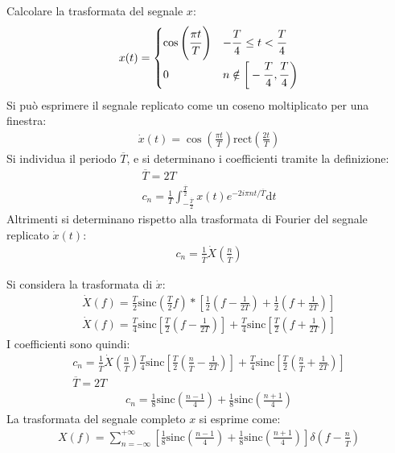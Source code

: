\documentclass{article}
\newcommand{\rect}{\mbox{rect}}
\newcommand{\sinc}{\mbox{sinc}}
\newcommand{\df}{\mathrm{d}}
\begin{document}
Calcolare la trasformata del segnale $x$:
\begin{gather*}
    x(t)=\begin{cases}
        \cos\displaystyle\left(\frac{\strut \pi t}{\strut T}\right) &-\displaystyle\frac{\strut T}{\strut 4}\leq t<\frac{\strut T}{\strut 4}\\
        0&n\notin\bigg[\displaystyle-\frac{\strut T}{\strut 4},\frac{\strut T}{\strut 4}\bigg)
    \end{cases}
\end{gather*}
Si può esprimere il segnale replicato come un coseno moltiplicato per una finestra:
\begin{gather*}
    \dot x(t)=\cos\displaystyle\left(\frac{\pi t}{T}\right)\rect\left(\frac{2t}{T}\right)
\end{gather*}
Si individua il periodo $\overline{T}$, e si determinano i coefficienti tramite la definizione:
\begin{gather*}
    \overline{T}=2T\\
    c_n=\displaystyle\frac{1}{T}\int_{-\frac{\overline{T}}{2}}^{\frac{\overline{T}}{2}}x(t)e^{-2i\pi nt/\overline{T}}\df t
\end{gather*}
Altrimenti si determinano rispetto alla trasformata di Fourier del segnale replicato $\dot x(t)$:
\begin{gather*}
    c_n=\displaystyle\frac{1}{\overline{T}}\dot X\left(\frac{n}{\overline{T}}\right)
\end{gather*}

Si considera la trasformata di $\dot x$:
\begin{gather*}
    \dot X(f)=\displaystyle\frac{T}{2}\sinc\left(\frac{T}{2}f\right)*\left[\frac{1}{2}\left(f-\frac{1}{2T}\right)+\frac{1}{2}\left(f+\frac{1}{2T}\right)\right]\\
    \dot X(f)=\displaystyle\frac{T}{4}\sinc\left[\frac{T}{2}\left(f-\frac{1}{2T}\right)\right]+\frac{T}{4}\sinc\left[\frac{T}{2}\left(f+\frac{1}{2T}\right)\right]
\end{gather*}
I coefficienti sono quindi:
\begin{gather*}
    c_n=\frac{1}{\overline{T}}\dot X\left(\frac{n}{\overline{T}}\right)\frac{T}{4}\sinc\left[\frac{T}{2}\left(\frac{n}{\overline{T}}-\frac{1}{2T}\right)\right]+\frac{T}{4}\sinc\left[\frac{T}{2}\left(\frac{n}{\overline{T}}+\frac{1}{2T}\right)\right]\\
    \overline{T}=2T
\end{gather*}
\begin{gather}
    c_n=\displaystyle\frac{1}{8}\sinc\left(\frac{n-1}{4}\right)+\frac{1}{8}\sinc\left(\frac{n+1}{4}\right)
\end{gather}
La trasformata del segnale completo $x$ si esprime come:
\begin{gather}
    X(f)=\displaystyle\sum_{n=-\infty}^{+\infty}\left[\frac{1}{8}\sinc\left(\frac{n-1}{4}\right)+\frac{1}{8}\sinc\left(\frac{n+1}{4}\right)\right]\delta\left(f-\frac{n}{\overline{T}}\right)
\end{gather}
\end{document}
